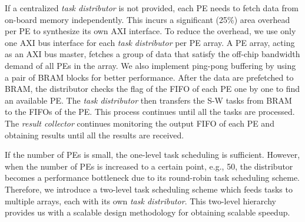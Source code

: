 If a centralized \textit{task distributor} is not provided, each PE needs to fetch data from on-board memory independently. 
This incurs a significant (25\%) area overhead per PE to synthesize its own AXI interface. 
To reduce the overhead, we use only one AXI bus interface for each \textit{task distributor} per PE array. 
A PE array, acting as an AXI bus master, fetches a group of data that satisfy the off-chip bandwidth demand of all PEs in the array. 
We also implement ping-pong buffering by using a pair of BRAM blocks for better performance. 
After the data are prefetched to BRAM, 
the distributor checks the flag of the FIFO of each PE one by one to find an available PE. 
The \textit{task distributor} then transfers the S-W tasks from BRAM to the FIFOs of the PE. 
This process continues until all the tasks are processed.
The \textit{result collector} continues monitoring the output FIFO of each PE and obtaining results until all the results are received.

If the number of PEs is small, the one-level task scheduling is sufficient. 
However, when the number of PEs is increased to a certain point, e.g., 50,  
the distributor becomes a performance bottleneck due to its round-robin task scheduling scheme.
Therefore, we introduce a two-level task scheduling scheme which feeds tasks to multiple arrays, each with its own \textit{task distributor}. 
This two-level hierarchy provides us with a scalable design methodology for obtaining scalable speedup.
